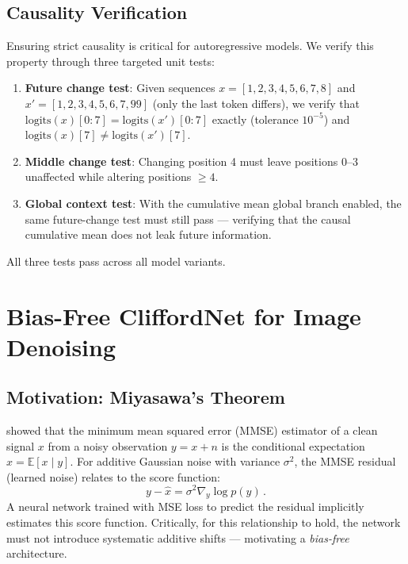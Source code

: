 \documentclass{article}
\begin{document}
\subsection{Causality Verification}
\label{sec:causality_test}

Ensuring strict causality is critical for autoregressive models.
We verify this property through three targeted unit tests:

\begin{enumerate}
  \item \textbf{Future change test}: Given sequences $x = [1, 2, 3, 4, 5, 6, 7, 8]$ and $x' = [1, 2, 3, 4, 5, 6, 7, 99]$ (only the last token differs), we verify that $\text{logits}(x)[0{:}7] = \text{logits}(x')[0{:}7]$ exactly (tolerance $10^{-5}$) and $\text{logits}(x)[7] \ne \text{logits}(x')[7]$.
  \item \textbf{Middle change test}: Changing position 4 must leave positions 0--3 unaffected while altering positions $\ge 4$.
  \item \textbf{Global context test}: With the cumulative mean global branch enabled, the same future-change test must still pass --- verifying that the causal cumulative mean does not leak future information.
\end{enumerate}

All three tests pass across all model variants.

\section{Bias-Free CliffordNet for Image Denoising}
\label{sec:denoiser}

\subsection{Motivation: Miyasawa's Theorem}

\citet{miyasawa1961empirical} showed that the minimum mean squared error (MMSE) estimator of a clean signal $x$ from a noisy observation $y = x + n$ is the conditional expectation $\hat{x} = \mathbb{E}[x \mid y]$.
For additive Gaussian noise with variance $\sigma^2$, the MMSE residual (learned noise) relates to the score function:
\begin{equation}
  y - \hat{x} = \sigma^2 \nabla_y \log p(y)\,.
  \label{eq:score}
\end{equation}
A neural network trained with MSE loss to predict the residual implicitly estimates this score function.
Critically, for this relationship to hold, the network must not introduce systematic additive shifts --- motivating a \emph{bias-free} architecture.
\end{document}
